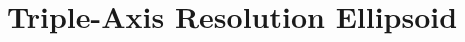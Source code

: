 \documentclass[english]{book}
\begin{document}




\chapter{Triple-Axis Resolution Ellipsoid}







\end{document}
